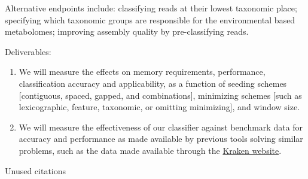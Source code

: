 \documentclass{elsarticle}
\begin{document}
Alternative endpoints include: classifying reads at their lowest
taxonomic place; specifying which taxonomic groups are responsible for
the environmental based metabolomes; improving assembly quality by
pre-classifying reads.

Deliverables:
\begin{enumerate}
\item We will measure the effects on memory requirements, performance, classification accuracy and applicability,
as a function of seeding schemes [contiguous, spaced, gapped, and combinations],
minimizing schemes [such as lexicographic, feature, taxonomic, or omitting minimizing],
and window size.
\item We will measure the effectiveness of our classifier against benchmark data for accuracy
and performance as made available by previous tools solving similar problems, such as the
data made available through the \href{https://ccb.jhu.edu/software/kraken/}{Kraken website}.
\end{enumerate}

\vspace*{3em}



Unused citations~\citep{li2012bioinformatics, chikhi2014recomb,
orenstein2016aib, hahn2016pcb}




\end{document}
